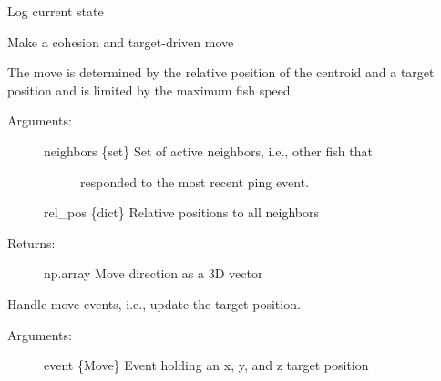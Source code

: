 \documentclass[letterpaper,10pt,english]{sphinxmanual}
\begin{document}
\begin{fulllineitems}
\begin{fulllineitems}
\begin{description}
\end{description}

\end{fulllineitems}


\begin{fulllineitems}
\label{\detokenize{index:fish.Fish.log}}
Log current state

\end{fulllineitems}


\begin{fulllineitems}
\label{\detokenize{index:fish.Fish.move}}
Make a cohesion and target-driven move

The move is determined by the relative position of the centroid and a
target position and is limited by the maximum fish speed.
\begin{description}
\item[{Arguments:}] \leavevmode\begin{description}
\item[{neighbors \{set\} \textendash{} Set of active neighbors, i.e., other fish that}] \leavevmode
responded to the most recent ping event.

\end{description}

rel\_pos \{dict\} \textendash{} Relative positions to all neighbors

\item[{Returns:}] \leavevmode
np.array \textendash{} Move direction as a 3D vector

\end{description}

\end{fulllineitems}


\begin{fulllineitems}
\label{\detokenize{index:fish.Fish.move_handler}}
Handle move events, i.e., update the target position.
\begin{description}
\item[{Arguments:}] \leavevmode
event \{Move\} \textendash{} Event holding an x, y, and z target position


\end{description}
\end{fulllineitems}
\end{fulllineitems}
\end{document}
